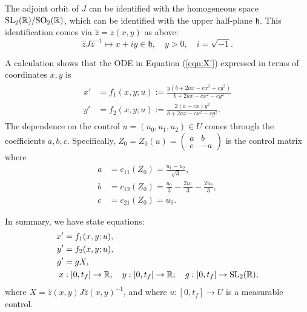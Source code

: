 \documentclass{article}
\theoremstyle{remark}
\newcommand{\ring}[1]{\mathbb{#1}}
\newcommand{\op}[1]{\hbox{#1}}
\def\SL{\op{SL}_2(\ring{R})}
\def\SO{\op{SO}_2(\ring{R})}
\def\h{\mathfrak h}
\begin{document}
The adjoint orbit of $J$ can be identified with the homogeneous space
$\SL/\SO$, which can be identified with the upper
half-plane $\h$.  This identification comes via $\hat z= z(x,y)$ as above:
\begin{equation}\label{eqn:X-h}
\hat z J \hat z^{-1} \mapsto  x + i y\in\h,\quad y>0,\quad i = \sqrt{-1}.
\end{equation}


A calculation shows that the ODE in Equation (\ref{eqn:X'}) expressed
in terms of coordinates $x,y$ is
\begin{align}\label{eqn:ode-state-upper}
\begin{split}
x' &= f_1(x,y;u):=
\frac{y (b + 2 a x - c x^2 + c y^2)}{b + 2 a x - c x^2 - c y^2}\\
y' &= f_2(x,y;u):=
\frac{2 (a - c x) y^2}{b + 2 a x - c x^2 - c y^2}.
\end{split}
\end{align}
The dependence on the control $u=(u_0,u_1,u_2)\in U$ comes through the
coefficients $a,b,c$.  Specifically, $Z_0 = Z_0(u)=\begin{pmatrix} a &
  b \\ c & -a\end{pmatrix}$ is the control matrix where
\begin{align*}
a &= c_{11}(Z_0) = \frac{u_1-u_2}{\sqrt{3}},\\
b &= c_{12}(Z_0) = \frac{u_0}{3} - \frac{2u_1}{3} - \frac{2 u_2}{3},\\
c &= c_{21}(Z_0) = u_0.
\end{align*}

In summary,
we have state equations:
\begin{align}\label{eqn:state}
\begin{split}
x' &= f_1(x,y;u),\\
y' &= f_2(x,y;u),\\
g' & = g X,\\
x&:[0,t_f]\to\ring{R};\quad y:[0,t_f]\to\ring{R};\quad g:[0,t_f]\to\SL;
\end{split}
\end{align}
where  $X = \hat z(x,y) J \hat z(x,y)^{-1}$, and
where $u:[0,t_f]\to U$ is a measurable control.
\end{document}
